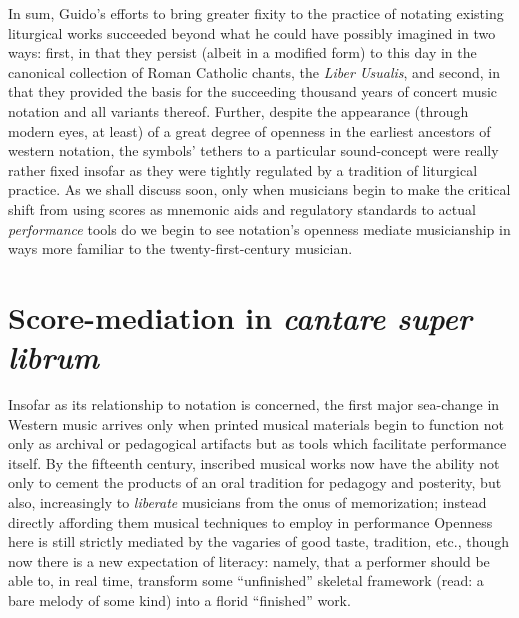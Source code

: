     In sum, Guido's efforts to bring greater fixity to the practice of notating existing liturgical works succeeded beyond what he could have possibly imagined in two ways: first, in that they persist (albeit in a modified form) to this day in the canonical collection of Roman Catholic chants, the \textit{Liber Usualis}, and second, in that they provided the basis for the succeeding thousand years of concert music notation and all variants thereof. Further, despite the appearance (through modern eyes, at least) of a great degree of openness in the earliest ancestors of western notation, the symbols' tethers to a particular sound-concept were really rather fixed insofar as they were tightly regulated by a tradition of liturgical practice. As we shall discuss soon, only when musicians begin to make the critical shift from using scores as mnemonic aids and regulatory standards to actual \textit{performance} tools do we begin to see notation's openness mediate musicianship in ways more familiar to the twenty-first-century musician.



        
        
\section{Score-mediation in \textit{cantare super librum}}


    Insofar as its relationship to notation is concerned, the first major sea-change in Western music arrives only when printed musical materials begin to function not only as archival or pedagogical artifacts but as tools which facilitate performance itself. By the fifteenth century, inscribed musical works now have the ability not only to cement the products of an oral tradition for pedagogy and posterity, but also, increasingly to \textit{liberate} musicians from the onus of memorization; instead directly affording them musical techniques to employ in performance Openness here is still strictly mediated by the vagaries of good taste, tradition, etc., though now there is a new expectation of literacy: namely, that a performer should be able to, in real time, transform some ``unfinished'' skeletal framework (read: a bare melody of some kind) into a florid ``finished'' work.

